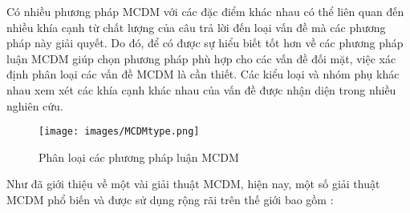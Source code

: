 Có nhiều phương pháp MCDM với các đặc điểm khác nhau có thể liên quan đến nhiều khía cạnh từ chất lượng của câu trả lời đến loại vấn đề mà các phương pháp này giải quyết. Do đó, để có được sự hiểu biết tốt hơn về các phương pháp luận MCDM giúp chọn phương pháp phù hợp cho các vấn đề đối mặt, việc xác định phân loại các vấn đề MCDM là cần thiết. Các kiểu loại và nhóm phụ khác nhau xem xét các khía cạnh khác nhau của vấn đề được nhận diện trong nhiều nghiên cứu. 

\begin{figure}[H]
    \centering
    \texttt{[image: images/MCDMtype.png]}
    \vspace{0.6cm}
    \caption{Phân loại các phương pháp luận MCDM}
\end{figure}

Như đã giới thiệu về một vài giải thuật MCDM, hiện nay, một số giải thuật MCDM phổ biến và được sử dụng rộng rãi trên thế giới bao gồm \cite{sciencedirect1}: 


